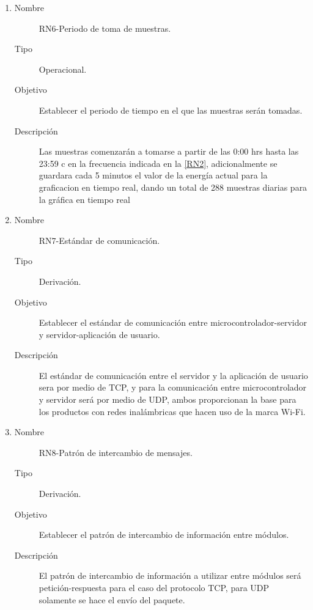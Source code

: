 \begin{enumerate}[label=RN\arabic*.]
\item \label{RN6}
		\begin{description}
			\item[Nombre] RN6-Periodo de toma de muestras.
			\item[Tipo] Operacional.
			\item[Objetivo] Establecer el periodo de tiempo en el que las muestras serán tomadas.
			\item[Descripción] Las muestras comenzarán a tomarse a partir de las 0:00 hrs hasta las 23:59 c en la frecuencia indicada en la \ref{RN2}, adicionalmente se guardara cada 5 minutos el valor de la energía actual para la graficacion en tiempo real, dando un total de 288 muestras diarias para la gráfica en tiempo real		\end{description}
		
\item \label{RN7}
		\begin{description}
			\item[Nombre] RN7-Estándar de comunicación.
			\item[Tipo] Derivación.
			\item[Objetivo] Establecer el estándar de comunicación entre microcontrolador-servidor y servidor-aplicación de usuario.
			\item[Descripción] El estándar de comunicación entre el servidor y la aplicación de usuario sera por medio de TCP, y para la comunicación entre microcontrolador y servidor será por medio de UDP, ambos proporcionan la base para los productos con redes inalámbricas que hacen uso de la marca Wi-Fi.
		\end{description}
		
\item \label{RN8}
		\begin{description}
			\item[Nombre] RN8-Patrón de intercambio de mensajes.
			\item[Tipo] Derivación.
			\item[Objetivo] Establecer el patrón de intercambio de información entre módulos.
			\item[Descripción] El patrón de intercambio de información a utilizar entre módulos será petición-respuesta para el caso del protocolo TCP, para UDP solamente se hace el envío del paquete.
		\end{description}
		

\end{enumerate}
